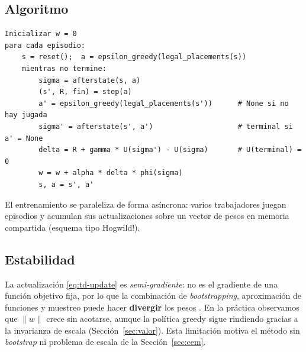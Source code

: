\subsection{Algoritmo}
\begin{verbatim}
Inicializar w = 0
para cada episodio:
    s = reset();  a = epsilon_greedy(legal_placements(s))
    mientras no termine:
        sigma = afterstate(s, a)
        (s', R, fin) = step(a)
        a' = epsilon_greedy(legal_placements(s'))      # None si no hay jugada
        sigma' = afterstate(s', a')                    # terminal si a' = None
        delta = R + gamma * U(sigma') - U(sigma)       # U(terminal) = 0
        w = w + alpha * delta * phi(sigma)
        s, a = s', a'
\end{verbatim}
El entrenamiento se paraleliza de forma asíncrona: varios trabajadores juegan
episodios y acumulan sus actualizaciones sobre un vector de pesos en memoria
compartida (esquema tipo Hogwild!).

\subsection{Estabilidad}
La actualización \eqref{eq:td-update} es \emph{semi-gradiente}: no es el gradiente
de una función objetivo fija, por lo que la combinación de \emph{bootstrapping},
aproximación de funciones y muestreo puede hacer \textbf{divergir} los pesos
\citep{sutton2018}. En la práctica observamos que $\lVert w \rVert$ crece sin
acotarse, aunque la política greedy sigue rindiendo gracias a la invarianza de
escala (Sección~\ref{sec:valor}). Esta limitación motiva el método sin
\emph{bootstrap} ni problema de escala de la Sección~\ref{sec:cem}.
